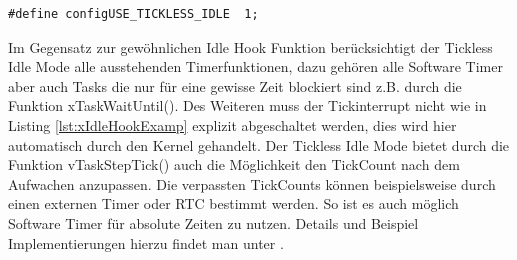 \begin{lstlisting}[label=lst:defineTicklessIdle, numbers = none]
#define configUSE_TICKLESS_IDLE  1; 
\end{lstlisting}
Im Gegensatz zur gewöhnlichen Idle Hook Funktion be\-rück\-sich\-tigt der Tickless Idle Mode alle ausstehenden Timerfunktionen, dazu gehören alle Software Timer aber auch Tasks die nur für eine gewisse Zeit blockiert sind z.B. durch die Funktion xTaskWaitUntil(). Des Weiteren muss der Tickinterrupt nicht wie in Listing \ref{lst:xIdleHookExamp} explizit abgeschaltet werden, dies wird hier automatisch durch den Kernel gehandelt. Der Tickless Idle Mode bietet durch die Funktion vTaskStepTick() auch die Möglichkeit den TickCount nach dem Aufwachen anzupassen. Die verpassten TickCounts können beispielsweise durch einen externen Timer oder RTC bestimmt werden. So ist es auch möglich Software Timer für absolute Zeiten zu nutzen. Details und Beispiel Implementierungen hierzu findet man unter \cite{FreeRtosAdvanced}.  

